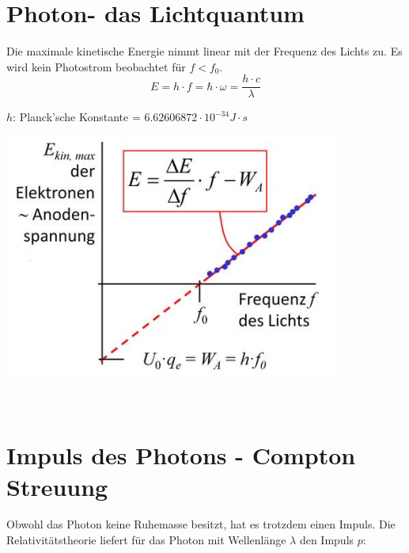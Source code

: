 \section{Photon- das Lichtquantum}
Die maximale kinetische Energie nimmt linear mit der Frequenz des Lichts zu. Es wird kein Photostrom beobachtet für $f<f_0$.\
\[
	E=h\cdot f = \hbar \cdot \omega = \frac{h \cdot c}{\lambda}
\]
\begin{footnotesize}
	$h$:	Planck'sche Konstante = $6.62606872\cdot 10^{-34} J\cdot s$\\
\end{footnotesize}
\begin{center}
	\includegraphics[scale = 0.3]{images/photon_energie.jpg}
\end{center}
\
\\
\section{Impuls des Photons - Compton Streuung}
Obwohl das Photon keine Ruhemasse besitzt, hat es trotzdem einen Impuls. Die Relativitätstheorie liefert für das Photon mit Wellenlänge $\lambda$ den Impuls $p$:\


